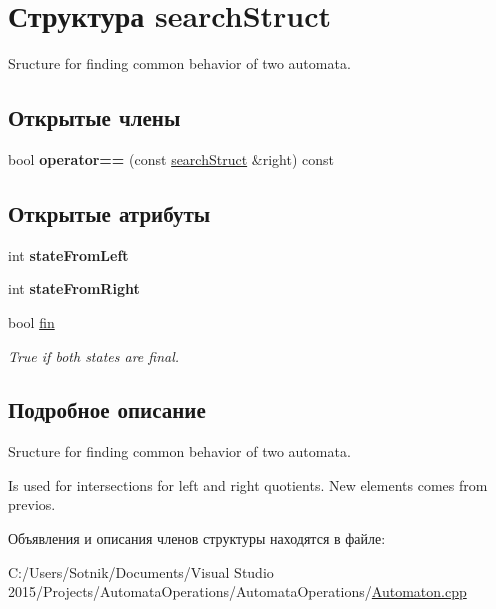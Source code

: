 \hypertarget{structsearch_struct}{}\section{Структура search\+Struct}
\label{structsearch_struct}


Sructure for finding common behavior of two automata.  


\subsection*{Открытые члены}
\begin{DoxyCompactItemize}
\item 
\mbox{\label{structsearch_struct_aa6247dd92828abe847ce30cfbdf5f0ed}} 
bool {\bfseries operator==} (const \mbox{\hyperlink{structsearch_struct}{search\+Struct}} \&right) const
\end{DoxyCompactItemize}
\subsection*{Открытые атрибуты}
\begin{DoxyCompactItemize}
\item 
\mbox{\label{structsearch_struct_abbe7e025ae4df5b004224b1edc458988}} 
int {\bfseries state\+From\+Left}
\item 
\mbox{\label{structsearch_struct_ae65868f3c5ab167eadf5e85d5e04c665}} 
int {\bfseries state\+From\+Right}
\item 
\mbox{\label{structsearch_struct_a010eef91549736ba32dad485c865093f}} 
bool \mbox{\hyperlink{structsearch_struct_a010eef91549736ba32dad485c865093f}{fin}}
\begin{DoxyCompactList}\small\item\em True if both states are final. \end{DoxyCompactList}\end{DoxyCompactItemize}


\subsection{Подробное описание}
Sructure for finding common behavior of two automata. 

Is used for intersections for left and right quotients. New elements comes from previos. 

Объявления и описания членов структуры находятся в файле\+:\begin{DoxyCompactItemize}
\item 
C\+:/\+Users/\+Sotnik/\+Documents/\+Visual Studio 2015/\+Projects/\+Automata\+Operations/\+Automata\+Operations/\mbox{\hyperlink{_automaton_8cpp}{Automaton.\+cpp}}\end{DoxyCompactItemize}
